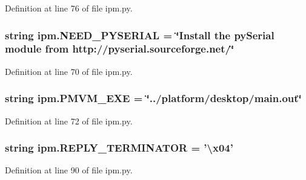 Definition at line 76 of file ipm.\-py.

\hypertarget{namespaceipm_a8f17360233ab2f19825bd1f921af328f}{
\subsubsection[{N\-E\-E\-D\-\_\-\-P\-Y\-S\-E\-R\-I\-A\-L}]{\setlength{\rightskip}{0pt plus 5cm}string ipm.\-N\-E\-E\-D\-\_\-\-P\-Y\-S\-E\-R\-I\-A\-L = \char`\"{}Install the py\-Serial module from http\-://pyserial.\-sourceforge.\-net/\char`\"{}}}\label{namespaceipm_a8f17360233ab2f19825bd1f921af328f}


Definition at line 70 of file ipm.\-py.

\hypertarget{namespaceipm_a3369401b0e7fcfbf0f0ff999bf911e17}{
\subsubsection[{P\-M\-V\-M\-\_\-\-E\-X\-E}]{\setlength{\rightskip}{0pt plus 5cm}string ipm.\-P\-M\-V\-M\-\_\-\-E\-X\-E = \char`\"{}../platform/desktop/main.\-out\char`\"{}}}\label{namespaceipm_a3369401b0e7fcfbf0f0ff999bf911e17}


Definition at line 72 of file ipm.\-py.

\hypertarget{namespaceipm_aa67380b41ccdd287d65bb257e8a3e8fc}{
\subsubsection[{R\-E\-P\-L\-Y\-\_\-\-T\-E\-R\-M\-I\-N\-A\-T\-O\-R}]{\setlength{\rightskip}{0pt plus 5cm}string ipm.\-R\-E\-P\-L\-Y\-\_\-\-T\-E\-R\-M\-I\-N\-A\-T\-O\-R = '\textbackslash{}{\bf x04}'}}\label{namespaceipm_aa67380b41ccdd287d65bb257e8a3e8fc}


Definition at line 90 of file ipm.\-py.

